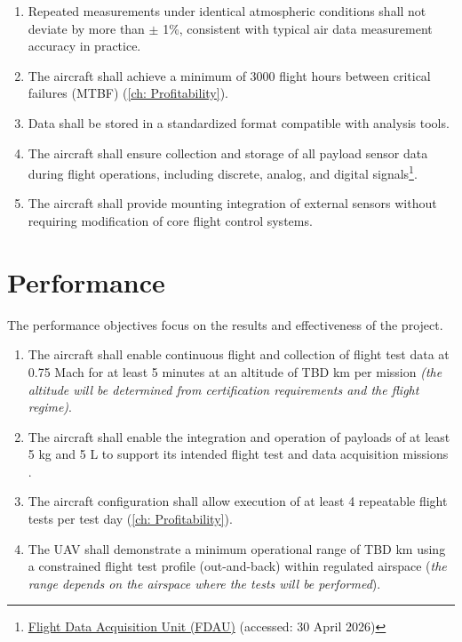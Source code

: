 \begin{enumerate}

    \item Repeated measurements under identical atmospheric conditions shall not deviate by more than $\pm$ 1\%, consistent with typical air data measurement accuracy in practice.

    \item The aircraft shall achieve a minimum of 3000 flight hours between critical failures (MTBF) (\autoref{ch: Profitability}). 

    \item Data shall be stored in a standardized format compatible with analysis tools.

    \item The aircraft shall ensure collection and storage of all payload sensor data during flight operations, including discrete, analog, and digital signals\footnote{\href{https://skybrary.aero/articles/flight-data-acquisition-unit-fdau}{Flight Data Acquisition Unit (FDAU)} (accessed: 30 April 2026)}.

    \item The aircraft shall provide mounting integration of external sensors without requiring modification of core flight control systems.
    
\end{enumerate}

\section{Performance}
The performance objectives focus on the results and effectiveness of the project.

\begin{enumerate}

    \item The aircraft shall enable continuous flight and collection of flight test data at 0.75 Mach \cite{Castro2026} for at least 5 minutes at an altitude of TBD km per mission \textit{(the altitude will be determined from certification requirements and the flight regime)}.

    \item The aircraft shall enable the integration and operation of payloads of at least 5 kg and 5 L to support its intended flight test and data acquisition missions \cite{Castro2026}.

    \item The aircraft configuration shall allow execution of at least 4 repeatable flight tests per test day (\autoref{ch: Profitability}).

    \item The UAV shall demonstrate a minimum operational range of TBD km using a constrained flight test profile (out-and-back) within regulated airspace (\textit{the range depends on the airspace where the tests will be performed}).

\end{enumerate}

